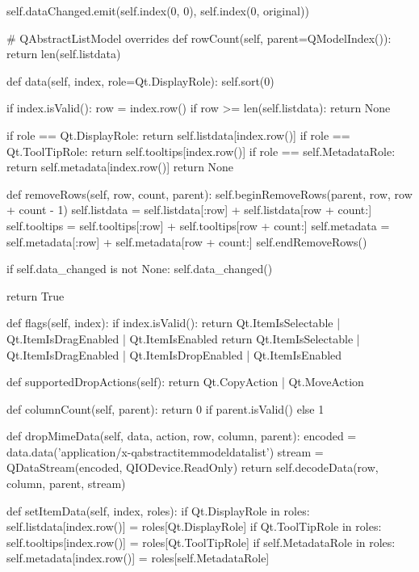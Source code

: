 \begin{pythoncode}
        self.dataChanged.emit(self.index(0, 0), self.index(0, original))

    # QAbstractListModel overrides
    def rowCount(self, parent=QModelIndex()):
        return len(self.listdata)

    def data(self, index, role=Qt.DisplayRole):
        self.sort(0)

        if index.isValid():
            row = index.row()
            if row >= len(self.listdata):
                return None

            if role == Qt.DisplayRole:
                return self.listdata[index.row()]
            if role == Qt.ToolTipRole:
                return self.tooltips[index.row()]
            if role == self.MetadataRole:
                return self.metadata[index.row()]
        return None

    def removeRows(self, row, count, parent):
        self.beginRemoveRows(parent, row, row + count - 1)
        self.listdata = self.listdata[:row] + self.listdata[row + count:]
        self.tooltips = self.tooltips[:row] + self.tooltips[row + count:]
        self.metadata = self.metadata[:row] + self.metadata[row + count:]
        self.endRemoveRows()

        if self.data_changed is not None:
            self.data_changed()

        return True

    def flags(self, index):
        if index.isValid():
            return Qt.ItemIsSelectable | Qt.ItemIsDragEnabled | Qt.ItemIsEnabled
        return Qt.ItemIsSelectable | Qt.ItemIsDragEnabled | Qt.ItemIsDropEnabled | Qt.ItemIsEnabled

    def supportedDropActions(self):
        return Qt.CopyAction | Qt.MoveAction

    def columnCount(self, parent):
        return 0 if parent.isValid() else 1

    def dropMimeData(self, data, action, row, column, parent):
        encoded = data.data('application/x-qabstractitemmodeldatalist')
        stream = QDataStream(encoded, QIODevice.ReadOnly)
        return self.decodeData(row, column, parent, stream)

    def setItemData(self, index, roles):
        if Qt.DisplayRole in roles:
            self.listdata[index.row()] = roles[Qt.DisplayRole]
        if Qt.ToolTipRole in roles:
            self.tooltips[index.row()] = roles[Qt.ToolTipRole]
        if self.MetadataRole in roles:
            self.metadata[index.row()] = roles[self.MetadataRole]


\end{pythoncode}
